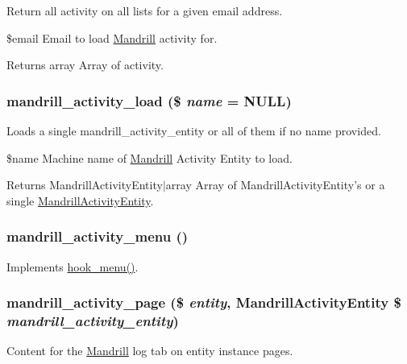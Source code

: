 \label{mandrill__activity_8module_a9703602184d50379b683cb3d63e8bf85}
Return all activity on all lists for a given email address.

\$email Email to load \hyperlink{classMandrill}{Mandrill} activity for.

\begin{DoxyReturn}{Returns}
array Array of activity. 
\end{DoxyReturn}
\hypertarget{mandrill__activity_8module_afa5dcbb883ef346e89f389138d82dda5}{
\subsubsection[{mandrill\_\-activity\_\-load}]{\setlength{\rightskip}{0pt plus 5cm}mandrill\_\-activity\_\-load (\$ {\em name} = {\ttfamily NULL})}}
\label{mandrill__activity_8module_afa5dcbb883ef346e89f389138d82dda5}
Loads a single mandrill\_\-activity\_\-entity or all of them if no name provided.

\$name Machine name of \hyperlink{classMandrill}{Mandrill} Activity Entity to load.

\begin{DoxyReturn}{Returns}
MandrillActivityEntity$|$array Array of MandrillActivityEntity's or a single \hyperlink{classMandrillActivityEntity}{MandrillActivityEntity}. 
\end{DoxyReturn}
\hypertarget{mandrill__activity_8module_a2967e85bba4a823650a30286878d62ea}{
\subsubsection[{mandrill\_\-activity\_\-menu}]{\setlength{\rightskip}{0pt plus 5cm}mandrill\_\-activity\_\-menu ()}}
\label{mandrill__activity_8module_a2967e85bba4a823650a30286878d62ea}
Implements \hyperlink{group__hooks_ga5c95244fea59b25666e409759e133ded}{hook\_\-menu()}. \hypertarget{mandrill__activity_8module_a7f19a71b20f386a718df03a81e614c5b}{
\subsubsection[{mandrill\_\-activity\_\-page}]{\setlength{\rightskip}{0pt plus 5cm}mandrill\_\-activity\_\-page (\$ {\em entity}, \/  {\bf MandrillActivityEntity} \$ {\em mandrill\_\-activity\_\-entity})}}
\label{mandrill__activity_8module_a7f19a71b20f386a718df03a81e614c5b}
Content for the \hyperlink{classMandrill}{Mandrill} log tab on entity instance pages.

